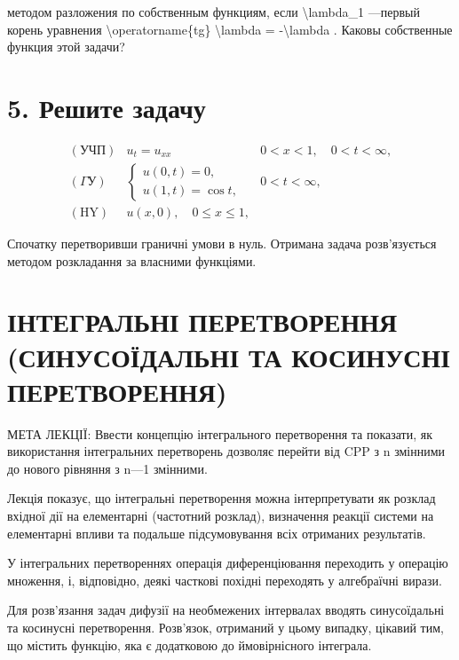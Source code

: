 \documentclass[
]{article}
\begin{document}
методом разложения по собственным функциям, если
\textbackslash lambda\_1 ---первый корень уравнения
\textbackslash operatorname\{tg\} \textbackslash lambda =
-\textbackslash lambda . Каковы собственные функция этой задачи?

\section{5. Решите
задачу}\label{ux440ux435ux448ux438ux442ux435-ux437ux430ux434ux430ux447ux443}

\[
\begin{aligned} (\text{УЧП}) & u_t = u_{xx} & 0 < x < 1, \quad 0 < t < \infty, \\ (\Gamma \text{У}) & \begin{cases} u(0, t) = 0, \\ u(1, t) = \cos t, \end{cases} & 0 < t < \infty, \\ (\text{HY}) & u(x, 0), \quad 0 \leqslant x \leqslant 1, \end{aligned}
\]

Спочатку перетворивши граничні умови в нуль. Отримана задача
розв'язується методом розкладання за власними функціями.

\section{ІНТЕГРАЛЬНІ ПЕРЕТВОРЕННЯ (СИНУСОЇДАЛЬНІ ТА КОСИНУСНІ
ПЕРЕТВОРЕННЯ)}\label{ux456ux43dux442ux435ux433ux440ux430ux43bux44cux43dux456-ux43fux435ux440ux435ux442ux432ux43eux440ux435ux43dux43dux44f-ux441ux438ux43dux443ux441ux43eux457ux434ux430ux43bux44cux43dux456-ux442ux430-ux43aux43eux441ux438ux43dux443ux441ux43dux456-ux43fux435ux440ux435ux442ux432ux43eux440ux435ux43dux43dux44f}

МЕТА ЛЕКЦІЇ: Ввести концепцію інтегрального перетворення та показати, як
використання інтегральних перетворень дозволяє перейти від CPP з n
змінними до нового рівняння з n---1 змінними.

Лекція показує, що інтегральні перетворення можна інтерпретувати як
розклад вхідної дії на елементарні (частотний розклад), визначення
реакції системи на елементарні впливи та подальше підсумовування всіх
отриманих результатів.

У інтегральних перетвореннях операція диференціювання переходить у
операцію множення, і, відповідно, деякі часткові похідні переходять у
алгебраїчні вирази.

Для розв'язання задач дифузії на необмежених інтервалах вводять
синусоїдальні та косинусні перетворення. Розв'язок, отриманий у цьому
випадку, цікавий тим, що містить функцію, яка є додатковою до
ймовірнісного інтеграла.
\end{document}
